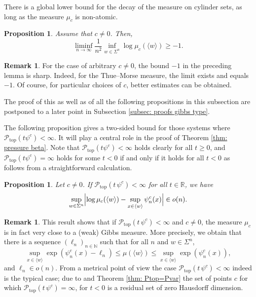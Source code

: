 \documentclass[11pt,reqno]{amsart}
\theoremstyle{plain}
\newtheorem{prop}[theorem]{Proposition}
\theoremstyle{definition}
\newtheorem{remark}[theorem]{Remark}
\newcommand{\R}{{\mathbb R}}
\newcommand{\N}{{\mathbb N}}
\newcommand{\mc}{\mathcal}
\newcommand{\ts}{\hspace{0.5pt}}
\begin{document}
There is a global lower bound for the decay of the measure on cylinder sets, as long as the measure $\mu_c$ is non-atomic.

\begin{prop}
\label{PROP:measure-decay}
Assume that $c \neq 0$. Then,
\[
\liminf_{n \to \infty} \frac{1}{n^2} \inf_{w \in \Sigma^n} \log \mu_c(\langle w \rangle) \geqslant -1.
\]
\end{prop}

\begin{remark}
For the case of arbitrary $c \neq 0$, the bound $-1$ in the preceding lemma is sharp. Indeed, for the Thue{\ts}--Morse measure, the limit exists and equals $-1$. Of course, for particular choices of $c$, better estimates can be obtained.
\end{remark}

The proof of this as well as of all the following propositions in this subsection are postponed to a later point in Subsection \ref{subsec: proofs gibbs type}.


The following proposition gives a two-sided bound for those systems where $\mc P_{\operatorname{top}}(t \psi^c) < \infty$.
It will play a central role in the proof of Theorem \ref{thm: pressure beta}.
Note that $\mc P_{\operatorname{top}}(t \psi^c) < \infty$ holds clearly for all $t \geqslant 0$, and $\mc P_{\operatorname{top}}(t \psi^c) = \infty$ holds for some $t<0$ if and only if it holds for all $t < 0$ as follows from a straightforward calculation.


\begin{prop}
\label{PROP:Gibbs-like}
Let $c \neq 0$. If $\mc P_{\operatorname{top}}(t\, \psi^c) < \infty$ for all $t\in \R$, we have 
\[
\sup_{w \in \Sigma^n} \Bigl|\log \mu_{c}(\langle w \rangle) - \sup_{x \in \langle w \rangle} \psi^c_n(x) \Bigr| \in o(n).
\]
\end{prop}



\begin{remark}
This result shows that if $\mc P_{\operatorname{top}}(t\,  \psi^c) < \infty$ and $c \neq 0$, the measure $\mu_{c}$ is in fact very close to a (weak) Gibbs measure. More precisely, we obtain that there is a sequence $(\ell_n)_{n \in \N}$ such that for all $n$ and $w \in \Sigma^n$,
\[
\sup_{x \in \langle w \rangle} \exp(\psi
^c_n(x) - \ell_n) \leqslant \mu(\langle w \rangle) \leqslant \sup_{x \in \langle w \rangle} \exp(\psi^c_n(x)),
\]
and $\ell_n \in o(n)$.
From a metrical point of view the case $\mc P_{\operatorname{top}}(t\,  \psi^c) < \infty$ indeed is the typical case; due to \cite[Thm.~A]{fan_generalized_2020} and Theorem \ref{thm: Ptop=Pvar} the set of points $c$ for which $\mc P_{\operatorname{top}}(t\,  \psi^c) = \infty$, for $t<0$ is a residual set of zero Hausdorff dimension.
\end{remark}
\end{document}
